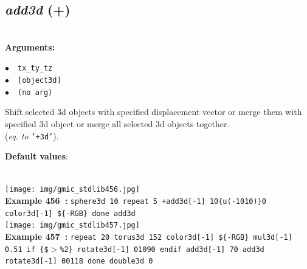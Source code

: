 \documentclass[a4paper,10.5pt,twoside]{book}
\def\comma{\discretionary{,}{}{,}}
\newcommand{\Cb}[1]{\textcolor{cb}{#1}}
\newcommand{\Cc}[1]{\textcolor{cc}{#1}}
\begin{document}
\subsection{\emph{add3d} (+)}\vspace*{-0.7em}
~\\\textbf{\Cb{Arguments: }}\begin{flushleft}
{\small \Cb{\hspace*{0.5cm}$\bullet$~~\texttt{tx{\comma}\_ty{\comma}\_tz}}}~~~\\
{\small \Cb{\hspace*{0.5cm}$\bullet$~~\texttt{[object3d]}}}~~~\\
{\small \Cb{\hspace*{0.5cm}$\bullet$~~\texttt{(no arg)}}}\end{flushleft}
Shift selected 3d objects with specified displacement vector{\comma} or merge them with specified
3d object{\comma} or merge all selected 3d objects together.
~\\(\emph{eq. to} {\small \texttt{'+3d'}}).
\begin{flushleft}\Cc{\textbf{Default values}:\\~\\\hspace*{0.5cm}{\small $\bullet$~~\texttt{'ty=tz=0'.}}}\end{flushleft}
\begin{center}\texttt{[image: img/gmic\_stdlib456.jpg]}\\
{\footnotesize \textbf{Example 456~:} \texttt{sphere3d 10 repeat 5 +add3d[-1] 10{\comma}\{u(-10{\comma}10)\}{\comma}0 color3d[-1] \$\{-RGB\} done add3d}}
\\\texttt{[image: img/gmic\_stdlib457.jpg]}\\
{\footnotesize \textbf{Example 457~:} \texttt{repeat 20 torus3d 15{\comma}2 color3d[-1] \$\{-RGB\} mul3d[-1] 0.5{\comma}1 if \{\$$>$\%2\} rotate3d[-1] 0{\comma}1{\comma}0{\comma}90 endif add3d[-1] 70 add3d rotate3d[-1] 0{\comma}0{\comma}1{\comma}18 done double3d 0}}
\end{center}
\end{document}
